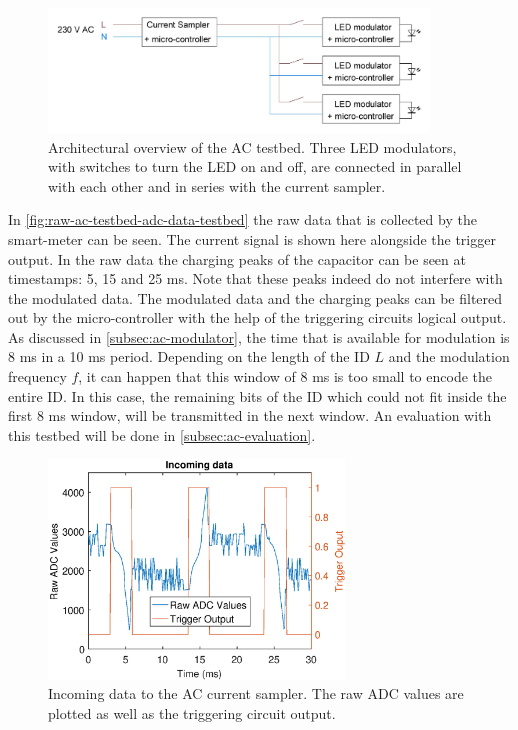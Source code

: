 \begin{figure}[t]
	\centering
	\includegraphics[angle=0,width=0.9\textwidth,keepaspectratio]{chapters/hardware-chapters/AC/ac-test-bed/ac-test-bed-architectural.JPG}
	\caption{Architectural overview of the AC testbed. Three LED modulators, with switches to turn the LED on and off, are connected in parallel with each other and in series with the current sampler.}
	\label{fig:ac-test-bed-architectural-overview}
\end{figure}



In \autoref{fig:raw-ac-testbed-adc-data-testbed} the raw data that is collected by the smart-meter can be seen.
The current signal is shown here alongside the trigger output.
In the raw data the charging peaks of the capacitor can be seen at timestamps: 5, 15 and 25 ms. %
Note that these peaks indeed do not interfere with the modulated data.
The modulated data and the charging peaks can be filtered out by the micro-controller with the help of the triggering circuits logical output.
As discussed in \autoref{subsec:ac-modulator}, the time that is available for modulation is 8 ms in a 10 ms period.
Depending on the length of the ID $L$ and the modulation frequency $f$, it can happen that this window of 8 ms is too small to encode the entire ID.
In this case, the remaining bits of the ID which could not fit inside the first 8 ms window, will be transmitted in the next window.
An evaluation with this testbed will be done in \autoref{subsec:ac-evaluation}.



\begin{figure}[ht]
  \centering
  \includegraphics[width=0.7\textwidth]{chapters/evaluation-chapters/hardware/ac/raw-ac-testbed-adc-data.eps}
    \caption{Incoming data to the AC current sampler. The raw ADC values are plotted as well as the triggering circuit output.}
  \label{fig:raw-ac-testbed-adc-data-testbed}
\end{figure}

